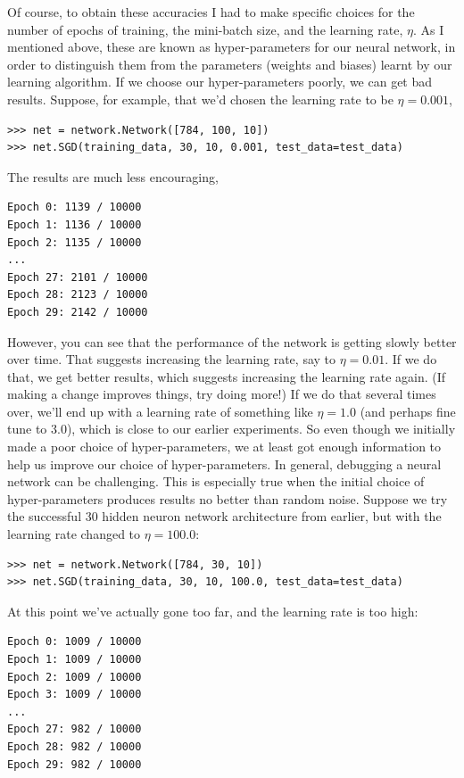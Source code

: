 \documentclass[a4paper,twoside,10pt]{book}
\begin{document}
Of course, to obtain these accuracies I had to make specific choices for the number of epochs of training, the mini-batch size, and the learning rate, $\eta$. As I mentioned above, these are known as hyper-parameters for our neural network, in order to distinguish them from the parameters (weights and biases) learnt by our learning algorithm. If we choose our hyper-parameters poorly, we can get bad results. Suppose, for example, that we'd chosen the learning rate to be $\eta=0.001$,
\begin{lstlisting}
>>> net = network.Network([784, 100, 10])
>>> net.SGD(training_data, 30, 10, 0.001, test_data=test_data)
\end{lstlisting}

The results are much less encouraging,
\begin{lstlisting}
Epoch 0: 1139 / 10000
Epoch 1: 1136 / 10000
Epoch 2: 1135 / 10000
...
Epoch 27: 2101 / 10000
Epoch 28: 2123 / 10000
Epoch 29: 2142 / 10000
\end{lstlisting}

However, you can see that the performance of the network is getting slowly better over time. That suggests increasing the learning rate, say to $\eta =0.01$. If we do that, we get better results, which suggests increasing the learning rate again. (If making a change improves things, try doing more!) If we do that several times over, we'll end up with a learning rate of something like $\eta=1.0$ (and perhaps fine tune to 3.0), which is close to our earlier experiments. So even though we initially made a poor choice of hyper-parameters, we at least got enough information to help us improve our choice of hyper-parameters.
In general, debugging a neural network can be challenging. This is especially true when the initial choice of hyper-parameters produces results no better than random noise. Suppose we try the successful 30 hidden neuron network architecture from earlier, but with the learning rate changed to $\eta=100.0$:
\begin{lstlisting}
>>> net = network.Network([784, 30, 10])
>>> net.SGD(training_data, 30, 10, 100.0, test_data=test_data)
\end{lstlisting}
At this point we've actually gone too far, and the learning rate is too high:

\begin{lstlisting}
Epoch 0: 1009 / 10000
Epoch 1: 1009 / 10000
Epoch 2: 1009 / 10000
Epoch 3: 1009 / 10000
...
Epoch 27: 982 / 10000
Epoch 28: 982 / 10000
Epoch 29: 982 / 10000
\end{lstlisting}
\end{document}

